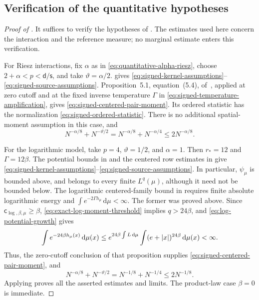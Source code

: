 \documentclass[11pt,reqno]{amsart}
\numberwithin{equation}{section}
\theoremstyle{plain}
\theoremstyle{remark}
\DeclarePairedDelimiter{\abs}{\lvert}{\rvert}
\renewcommand{\d}{\mathsf{d}}
\newcommand{\md}{\mathrm{d}}
\newcommand{\be}{\beta}
\newcommand{\s}{\mathsf{s}}
\begin{document}
\subsection{Verification of the quantitative hypotheses}
\label{subsubsec:signed-model-verification}

\begin{proof}[Proof of ]
It suffices to verify the hypotheses of
.  The estimates used here concern
the interaction and the reference measure; no marginal estimate enters
this verification.

For Riesz interactions, fix $\alpha$ as in
\eqref{eq:quantitative-alpha-riesz}, choose $2+\alpha<p<\d/\s$, and take
$\vartheta=\alpha/2$.   gives
\eqref{eq:signed-kernel-assumptions}--\eqref{eq:signed-source-assumptions}.
Proposition~5.1, equation~(5.4), of~\cite{DGR26}, applied at zero cutoff
and at the fixed inverse temperature $\Gamma$ in
\eqref{eq:signed-temperature-amplification}, gives
\eqref{eq:signed-centered-pair-moment}.  Its ordered statistic has the
normalization \eqref{eq:signed-ordered-statistic}.  There is no additional
spatial-moment assumption in this case, and
\begin{equation}\label{eq:signed-Riesz-model-rate}
 N^{-\alpha/8}+N^{-\vartheta/2}
 =N^{-\alpha/8}+N^{-\alpha/4}\leq2N^{-\alpha/8}.
\end{equation}

For the logarithmic model, take $p=4$, $\vartheta=1/2$, and $\alpha=1$.
Then $r_*=12$ and $\Gamma=12\be$.  The potential bounds in
 and the centered row estimates in
 give
\eqref{eq:signed-kernel-assumptions}--\eqref{eq:signed-source-assumptions}.
In particular, $\psi_\mu$ is bounded above, and belongs to every finite
$L^q(\mu)$, although it need not be bounded below.  The logarithmic
centered-family bound in \cite[Proposition~5.1]{DGR26} requires finite
absolute logarithmic energy and $\int e^{-2\Gamma h_\mu}\,\md\mu<\infty$.
The former was proved above.  Since $\mathsf c_{\log,\be,\mu}\geq\be$,
\eqref{eq:exact-log-moment-threshold} implies $q>24\be$, and
\eqref{eq:log-potential-growth} gives
\begin{equation}\label{eq:signed-log-centered-moment-check}
 \int e^{-24\be h_\mu(x)}\,\md\mu(x)
 \leq e^{24\be\int L\,\md\mu}
       \int(e+\abs x)^{24\be}\,\md\mu(x)<\infty.
\end{equation}
Thus, the zero-cutoff conclusion of that proposition supplies
\eqref{eq:signed-centered-pair-moment}, and
\begin{equation}\label{eq:signed-log-model-rate}
 N^{-\alpha/8}+N^{-\vartheta/2}
 =N^{-1/8}+N^{-1/4}\leq2N^{-1/8}.
\end{equation}
Applying  proves all the asserted
estimates and limits.  The product-law case $\be=0$ is immediate.
\end{proof}
\end{document}
